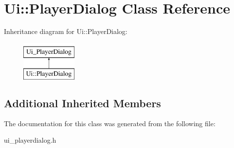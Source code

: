 \hypertarget{classUi_1_1PlayerDialog}{\section{Ui\-:\-:Player\-Dialog Class Reference}
\label{classUi_1_1PlayerDialog}
}
Inheritance diagram for Ui\-:\-:Player\-Dialog\-:\begin{figure}[H]
\begin{center}
\leavevmode
\includegraphics[height=2.000000cm]{classUi_1_1PlayerDialog}
\end{center}
\end{figure}
\subsection*{Additional Inherited Members}


The documentation for this class was generated from the following file\-:\begin{DoxyCompactItemize}
\item 
ui\-\_\-playerdialog.\-h\end{DoxyCompactItemize}

